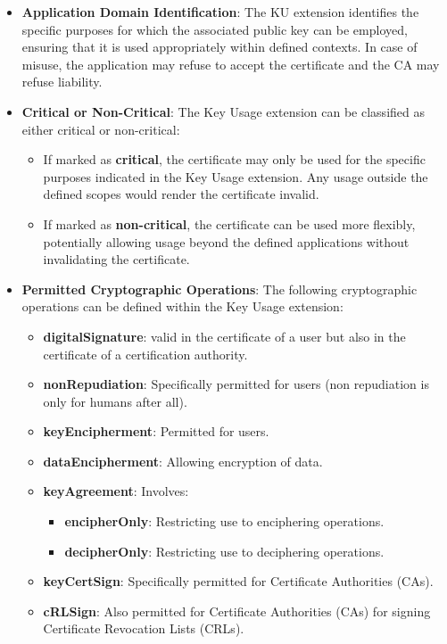 \begin{itemize}
  \item \textbf{Application Domain Identification}: The KU extension
    identifies the specific purposes for which the associated public
    key can be employed, ensuring that it is used appropriately
    within defined contexts. In case of misuse, the application may
    refuse to accept the certificate and the CA may refuse liability.

  \item \textbf{Critical or Non-Critical}: The Key Usage extension
    can be classified as either critical or non-critical:
    \begin{itemize}
      \item If marked as \textbf{critical}, the certificate may only
        be used for the specific purposes indicated in the Key Usage
        extension. Any usage outside the defined scopes would render
        the certificate invalid.
      \item If marked as \textbf{non-critical}, the certificate can
        be used more flexibly, potentially allowing usage beyond the
        defined applications without invalidating the certificate.
    \end{itemize}

  \item \textbf{Permitted Cryptographic Operations}: The following
    cryptographic operations can be defined within the Key Usage
    extension:
    \begin{itemize}
      \item \textbf{digitalSignature}: valid in the certificate of a
        user but also in the certificate of a certification authority.
      \item \textbf{nonRepudiation}: Specifically permitted for
        users (non repudiation is only for humans after all).
      \item \textbf{keyEncipherment}: Permitted for users.
      \item \textbf{dataEncipherment}: Allowing encryption of data.
      \item \textbf{keyAgreement}: Involves:
        \begin{itemize}
          \item \textbf{encipherOnly}: Restricting use to
            enciphering operations.
          \item \textbf{decipherOnly}: Restricting use to
            deciphering operations.
        \end{itemize}
      \item \textbf{keyCertSign}: Specifically permitted for
        Certificate Authorities (CAs).
      \item \textbf{cRLSign}: Also permitted for Certificate
        Authorities (CAs) for signing Certificate Revocation Lists
        (CRLs).
    \end{itemize}
\end{itemize}

